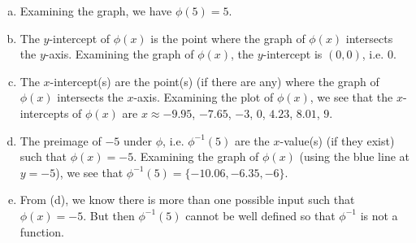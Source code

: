 \documentclass[11pt,letterpaper]{article}
\begin{document}
\sol 
\begin{enumerate}[(a)]
\item Examining the graph, we have $\phi(5)= 5$. \pspace

\item The $y$-intercept of $\phi(x)$ is the point where the graph of $\phi(x)$ intersects the $y$-axis. Examining the graph of $\phi(x)$, the $y$-intercept is $(0, 0)$, i.e. $0$. \pspace

\item The $x$-intercept(s) are the point(s) (if there are any) where the graph of $\phi(x)$ intersects the $x$-axis. Examining the plot of $\phi(x)$, we see that the $x$-intercepts of $\phi(x)$ are $x \approx -9.95$, $-7.65$, $-3$, $0$, $4.23$, $8.01$, $9$. \pspace

\item The preimage of $-5$ under $\phi$, i.e. $\phi^{-1}(5)$ are the $x$-value(s) (if they exist) such that $\phi(x)= -5$. Examining the graph of $\phi(x)$ (using the blue line at $y= -5$), we see that $\phi^{-1}(5)= \{ -10.06, -6.35, -6 \}$. \pspace

\item From (d), we know there is more than one possible input such that $\phi(x)= -5$. But then $\phi^{-1}(5)$ cannot be well defined so that $\phi^{-1}$ is not a function. 
\end{enumerate}
\end{document}
